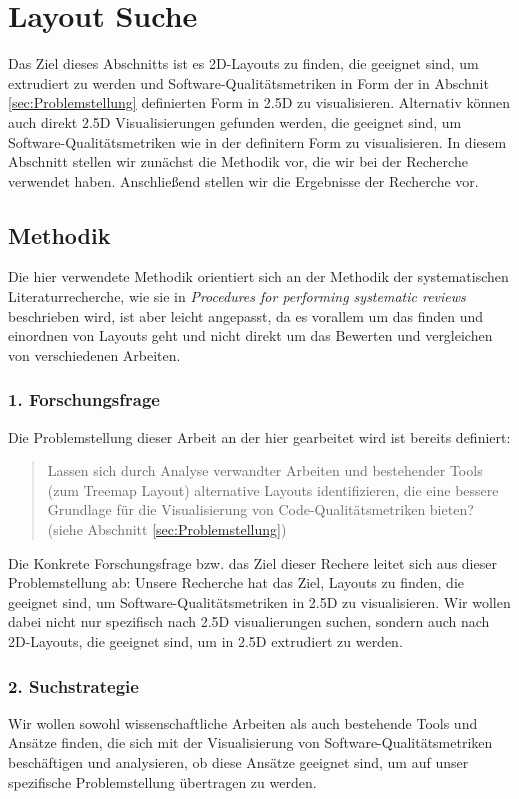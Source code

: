 \chapter{Layout Suche} \label{sec:LiteraturRecherche}
Das Ziel dieses Abschnitts ist es 2D-Layouts zu finden, die geeignet sind, um extrudiert zu werden und Software-Qualitätsmetriken in Form der in Abschnit \ref{sec:Problemstellung} definierten Form in 2.5D zu visualisieren. Alternativ können auch direkt 2.5D Visualisierungen gefunden werden, die geeignet sind, um Software-Qualitätsmetriken wie in der definitern Form zu visualisieren. 
In diesem Abschnitt stellen wir zunächst die Methodik vor, die wir bei der Recherche verwendet haben. Anschließend stellen wir die Ergebnisse der Recherche vor. 

\section{Methodik} \label{sec:Methodik}
Die hier verwendete Methodik orientiert sich an der Methodik der systematischen Literaturrecherche, wie sie in \textit{Procedures for performing systematic reviews}\cite{kitchenham2004procedures} beschrieben wird, ist aber leicht angepasst, da es vorallem um das finden und einordnen von Layouts geht und nicht direkt um das Bewerten und vergleichen von verschiedenen Arbeiten.

\subsection*{1. Forschungsfrage} \label{sec:Forschungsfrage}
Die Problemstellung dieser Arbeit an der hier gearbeitet wird ist bereits definiert:
\begin{quote}
    Lassen sich durch Analyse verwandter Arbeiten und bestehender Tools (zum Treemap Layout) alternative Layouts identifizieren, die eine bessere Grundlage für die Visualisierung von Code-Qualitätsmetriken bieten? (siehe Abschnitt \ref{sec:Problemstellung})
\end{quote}

Die Konkrete Forschungsfrage bzw. das Ziel dieser Rechere leitet sich aus dieser Problemstellung ab:
Unsere Recherche hat das Ziel, Layouts zu finden, die geeignet sind, um Software-Qualitätsmetriken in 2.5D zu visualisieren. Wir wollen dabei nicht nur spezifisch nach 2.5D visualierungen suchen, sondern auch nach 2D-Layouts, die geeignet sind, um in 2.5D extrudiert zu werden.

\subsection*{2. Suchstrategie} \label{sec:Suchstrategie}
Wir wollen sowohl wissenschaftliche Arbeiten als auch bestehende Tools und Ansätze finden, die sich mit der Visualisierung von Software-Qualitätsmetriken beschäftigen und analysieren, ob diese Ansätze geeignet sind, um auf unser spezifische Problemstellung übertragen zu werden.


